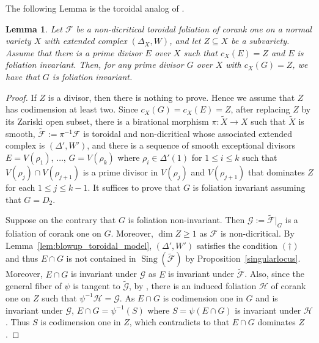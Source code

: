\documentclass[12pt,reqno]{amsart}
\newtheorem{lemma}[theorem]{Lemma}
\theoremstyle{definition}
\newcommand{\on}{\operatorname}
\newcommand\cF{{\mathcal{F}}}
\newcommand\cG{{\mathcal{G}}}
\newcommand\cH{{\mathcal{H}}}
\begin{document}
The following Lemma is the toroidal analog of \cite[Remark 2.16]{CS}. 
\begin{lemma}\label{lem_tang_exc_inv}
    Let $\cF$ be a non-dicritical toroidal foliation of corank one on a normal variety $X$ with extended complex $(\Delta_X,W)$, and let $Z\subseteq X$ be a subvariety. 
    Assume that there is a prime divisor $E$ over $X$ such that $c_X(E)=Z$ and $E$ is foliation invariant.
    Then, for any prime divisor $G$ over $X$ with $c_X(G)=Z$, we have that $G$ is foliation invariant.  
\end{lemma}

\begin{proof}
    If $Z$ is a divisor, then there is nothing to prove. Hence we assume that $Z$ has codimension at least two. 
    Since $c_X(G)=c_X(E)=Z$, after replacing $Z$ by its Zariski open subset, there is a birational morphism $\pi\colon \widetilde{X}\to X$ such that $\widetilde{X}$ is smooth, $\widetilde{\cF}:=\pi^{-1}\cF$ is toroidal and non-dicritical whose associated extended complex is $(\Delta',W')$, and there is a sequence of smooth exceptional divisors $E=V(\rho_1)$, $\ldots$, $G=V(\rho_k)$ where $\rho_i\in\Delta'(1)$ for $1\leq i\leq k$ such that $V(\rho_j)\cap V(\rho_{j+1})$ is a prime divisor in $V(\rho_j)$ and $V(\rho_{j+1})$ that dominates $Z$ for each $1\leq j\leq k-1$.
    It suffices to prove that $G$ is foliation invariant assuming that $G=D_2$.

    Suppose on the contrary that $G$ is foliation non-invariant. 
    Then $\cG:=\widetilde{\cF}\vert_{G}$ is a foliation of corank one on $G$. 
    Moreover, $\dim Z\geq 1$ as $\cF$ is non-dicritical. 
    By Lemma~\ref{lem:blowup_toroidal_model}, $(\Delta',W')$ satisfies the condition $(\dagger)$ and thus $E\cap G$ is not contained in $\on{Sing}(\widetilde{\cF})$ by Proposition~\ref{singularlocus}. 
    Moreover, $E\cap G$ is invariant under $\cG$ as $E$ is invariant under $\widetilde{\cF}$. 
    Also, since the general fiber of $\psi$ is tangent to $\widetilde{\cG}$, by \cite[Lemma 6.7]{ARAUJO201370}, there is an induced foliation $\cH$ of corank one on $Z$ such that $\psi^{-1}\cH=\cG$. 
    As $E\cap G$ is codimension one in $G$ and is invariant under $\cG$, $E\cap G = \psi^{-1}(S)$ where $S=\psi(E\cap G)$ is invariant under $\cH$. 
    Thus $S$ is codimension one in $Z$, which contradicts to that $E\cap G$ dominates $Z$.   
\end{proof}
\end{document}
